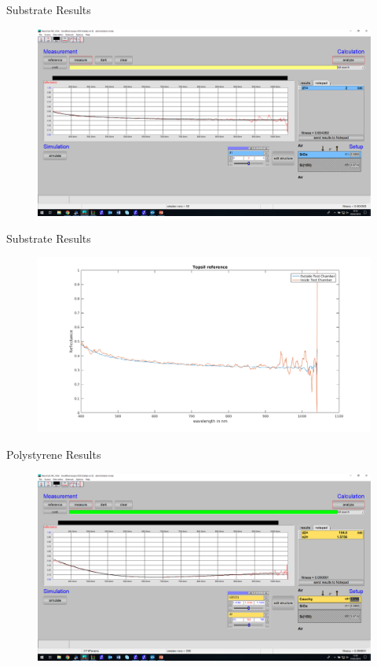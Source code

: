 \documentclass[10pt]{beamer}
\begin{document}
		\begin{frame}{Substrate Results}
			\begin{figure}
			\centering
			\includegraphics[width=\textwidth]{sub2.png}
			\end{figure}
			\end{frame}
			
			\begin{frame}{Substrate Results}
						\begin{figure}
						\centering
						\includegraphics[width=\textwidth]{topsil.png}
						\end{figure}
						\end{frame}
	
		\begin{frame}{Polystyrene Results}
			\begin{figure}
			\centering
			\includegraphics[width=\textwidth]{p1.png}
			\end{figure}
			\end{frame}
	
\end{document}

